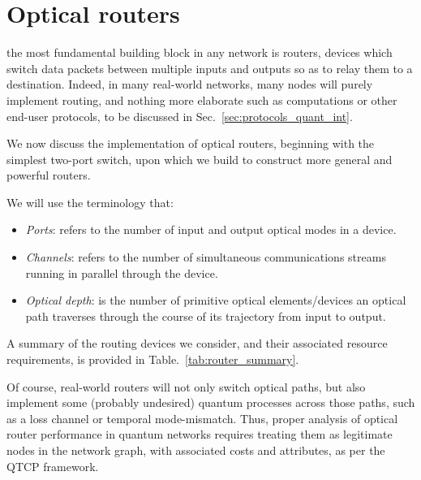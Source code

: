 %
%

\section{Optical routers} 

 the most fundamental building block in any network is routers, devices which switch data packets between multiple inputs and outputs so as to relay them to a destination. Indeed, in many real-world networks, many nodes will purely implement routing, and nothing more elaborate such as computations or other end-user protocols, to be discussed in Sec.~\ref{sec:protocols_quant_int}.

We now discuss the implementation of optical routers, beginning with the simplest two-port switch, upon which we build to construct more general and powerful routers.

We will use the terminology that:
\begin{itemize}
	\item \textit{Ports}: refers to the number of input and output optical modes in a device.
	\item \textit{Channels}: refers to the number of simultaneous communications streams running in parallel through the device.
	\item \textit{Optical depth}: is the number of primitive optical elements/devices an optical path traverses through the course of its trajectory from input to output.
\end{itemize}

A summary of the routing devices we consider, and their associated resource requirements, is provided in Table.~\ref{tab:router_summary}.

Of course, real-world routers will not only switch optical paths, but also implement some (probably undesired) quantum processes across those paths, such as a loss channel or temporal mode-mismatch. Thus, proper analysis of optical router performance in quantum networks requires treating them as legitimate nodes in the network graph, with associated costs and attributes, as per the QTCP framework.

